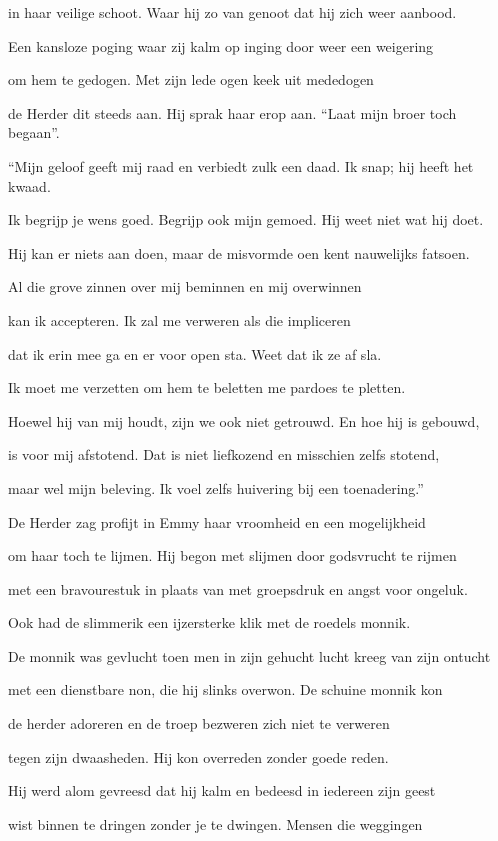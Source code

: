in haar veilige schoot.
Waar hij zo van genoot
dat hij zich weer aanbood.

Een kansloze poging
waar zij kalm op inging
door weer een weigering

om hem te gedogen.
Met zijn lede ogen
keek uit mededogen

de Herder dit steeds aan.
Hij sprak haar erop aan.
“Laat mijn broer toch begaan”.

“Mijn geloof geeft mij raad
en verbiedt zulk een daad.
Ik snap; hij heeft het kwaad.

Ik begrijp je wens goed.
Begrijp ook mijn gemoed.
Hij weet niet wat hij doet.

Hij kan er niets aan doen,
maar de misvormde oen
kent nauwelijks fatsoen.

Al die grove zinnen
over mij beminnen
en mij overwinnen

kan ik accepteren.
Ik zal me verweren
als die impliceren

dat ik erin mee ga
en er voor open sta.
Weet dat ik ze af sla.

Ik moet me verzetten
om hem te beletten
me pardoes te pletten.

Hoewel hij van mij houdt,
zijn we ook niet getrouwd.
En hoe hij is gebouwd,

is voor mij afstotend.
Dat is niet liefkozend
en misschien zelfs stotend,

maar wel mijn beleving.
Ik voel zelfs huivering
bij een toenadering.”

De Herder zag profijt
in Emmy haar vroomheid
en een mogelijkheid

om haar toch te lijmen.
Hij begon met slijmen
door godsvrucht te rijmen

met een bravourestuk
in plaats van met groepsdruk
en angst voor ongeluk.

Ook had de slimmerik
een ijzersterke klik
met de roedels monnik.

De monnik was gevlucht
toen men in zijn gehucht
lucht kreeg van zijn ontucht

met een dienstbare non,
die hij slinks overwon.
De schuine monnik kon

de herder adoreren
en de troep bezweren
zich niet te verweren

tegen zijn dwaasheden.
Hij kon overreden
zonder goede reden.

Hij werd alom gevreesd
dat hij kalm en bedeesd
in iedereen zijn geest

wist binnen te dringen
zonder je te dwingen.
Mensen die weggingen

